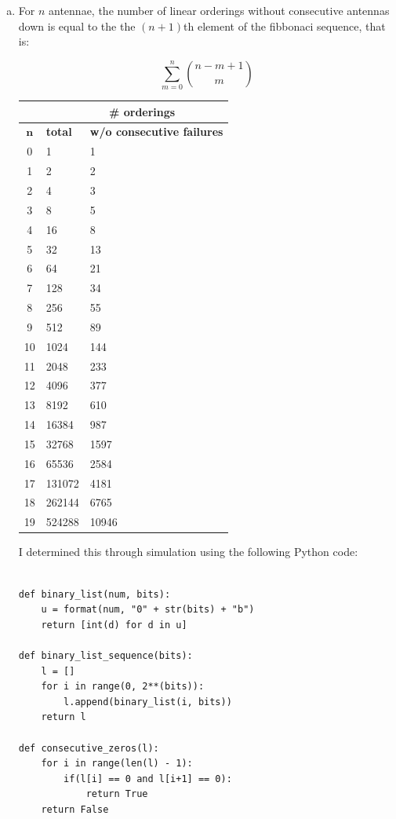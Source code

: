 \documentclass[11pt]{extarticle}
\begin{document}
\begin{enumerate}[(a)]

\item For $n$ antennae, the number of linear orderings without consecutive antennas down is equal to the the $(n+1)$th element of the fibbonaci sequence, that is:

$$
\sum_{m=0}^{n} {n - m + 1 \choose m}
$$

\begin{table}[ht!]
\centering
\scriptsize
\begin{tabular}{c|ll}
\toprule
 &  & \textbf{\ \ \ \# orderings}  \\
\midrule
$\mathbf{n}$ & \textbf{total} & \textbf{w/o consecutive failures} \\
\midrule
0&1&1\\
1&2&2\\
2&4&3\\
3&8&5\\
4&16&8\\
5&32&13\\
6&64&21\\
7&128&34\\
8&256&55\\
9&512&89\\
10&1024&144\\
11&2048&233\\
12&4096&377\\
13&8192&610\\
14&16384&987\\
15&32768&1597\\
16&65536&2584\\
17&131072&4181\\
18&262144&6765\\
19&524288&10946 \\
\bottomrule
\end{tabular}
\normalsize
\end{table}

I determined this through simulation using the following Python code: 

\scriptsize
\begin{verbatim}

def binary_list(num, bits):
    u = format(num, "0" + str(bits) + "b")
    return [int(d) for d in u] 

def binary_list_sequence(bits):
    l = []
    for i in range(0, 2**(bits)):
        l.append(binary_list(i, bits))
    return l

def consecutive_zeros(l):
    for i in range(len(l) - 1):
        if(l[i] == 0 and l[i+1] == 0):
            return True
    return False


\end{verbatim}
\end{enumerate}
\end{document}
